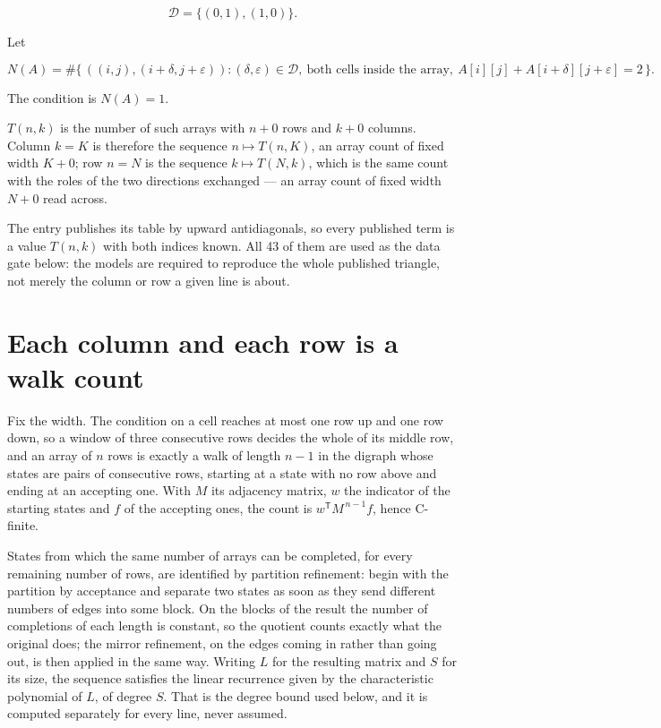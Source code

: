 \documentclass[11pt]{article}
\theoremstyle{definition}
\begin{document}
\[\mathcal{D} = \{(0,1), (1,0)\}.\]

Let

\[N(A) = \#\bigl\{\,((i,j),(i{+}\delta,j{+}\varepsilon)) : (\delta,\varepsilon) \in \mathcal{D},\ \text{both cells inside the array},\ A[i][j] + A[i{+}\delta][j{+}\varepsilon] = 2\,\bigr\}.\]

The condition is $N(A) = 1$.

$T(n,k)$ is the number of such arrays with $n + 0$ rows and $k + 0$ columns. Column $k = K$ is therefore the sequence $n \mapsto T(n,K)$, an array count of fixed width $K + 0$; row $n = N$ is the sequence $k \mapsto T(N,k)$, which is the same count with the roles of the two directions exchanged --- an array count of fixed width $N + 0$ read across.

The entry publishes its table by upward antidiagonals, so every published term is a value $T(n,k)$ with both indices known. All 43 of them are used as the data gate below: the models are required to reproduce the whole published triangle, not merely the column or row a given line is about.

\section{Each column and each row is a walk count}

Fix the width. The condition on a cell reaches at most one row up and one row down, so a window of three consecutive rows decides the whole of its middle row, and an array of $n$ rows is exactly a walk of length $n-1$ in the digraph whose states are pairs of consecutive rows, starting at a state with no row above and ending at an accepting one. With $M$ its adjacency matrix, $w$ the indicator of the starting states and $f$ of the accepting ones, the count is $w^{\mathsf T}M^{\,n-1}f$, hence C-finite.

States from which the same number of arrays can be completed, for every remaining number of rows, are identified by partition refinement: begin with the partition by acceptance and separate two states as soon as they send different numbers of edges into some block. On the blocks of the result the number of completions of each length is constant, so the quotient counts exactly what the original does; the mirror refinement, on the edges coming in rather than going out, is then applied in the same way. Writing $L$ for the resulting matrix and $S$ for its size, the sequence satisfies the linear recurrence given by the characteristic polynomial of $L$, of degree $S$. That is the degree bound used below, and it is computed separately for every line, never assumed.
\end{document}

